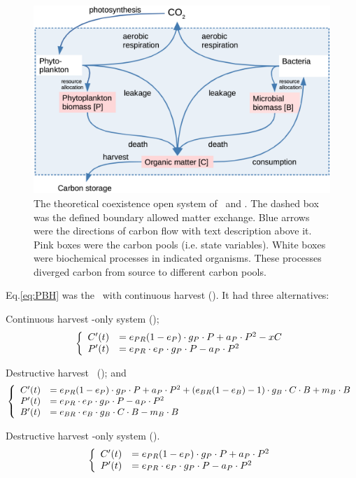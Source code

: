 \documentclass[../thesis.tex]{subfiles} %
\begin{document}
\begin{figure}[H]
    \centering
    \includegraphics[width=.8\linewidth]{media/model.png}
    \caption[Model visualization]{The theoretical coexistence open system of \phy\ and \bac.  The dashed box was the defined boundary allowed matter exchange.  Blue arrows were the directions of carbon flow with text description above it.  Pink boxes were the carbon pools (i.e. state variables).  White boxes were biochemical processes in indicated organisms.  These processes diverged carbon from source to different carbon pools.}
    \label{f:model}
\end{figure}

Eq.\ref{eq:PBH} was the \pbs\ with continuous harvest (\PBH).  It had three alternatives:

Continuous harvest \phy-only system (\PoH);
\begin{equation}\left\{\begin{array}{rl}
    C'(t) &= e_{PR}(1-e_P)\cdot g_P\cdot P +a_P\cdot P^2 -xC\\
    P'(t) &= e_{PR}\cdot e_P\cdot g_P\cdot P -a_P\cdot P^2
\end{array}\right.\label{eq:PoH}\end{equation}

Destructive harvest \pbs\ (\PBN); and
\begin{equation}\left\{\begin{array}{rl}
    C'(t) &= e_{PR}(1-e_P)\cdot g_P\cdot P +a_P\cdot P^2 +(e_{BR}(1-e_B)-1)\cdot g_B\cdot C\cdot B +m_B\cdot B\\
    P'(t) &= e_{PR}\cdot e_P\cdot g_P\cdot P -a_P\cdot P^2\\
    B'(t) &= e_{BR}\cdot e_B\cdot g_B\cdot C\cdot B -m_B\cdot B
\end{array}\right.\label{eq:PBN}\end{equation}

Destructive harvest \phy-only system (\PoN).
\begin{equation}\left\{\begin{array}{rl}
    C'(t) &= e_{PR}(1-e_P)\cdot g_P\cdot P +a_P\cdot P^2\\
    P'(t) &= e_{PR}\cdot e_P\cdot g_P\cdot P -a_P\cdot P^2
\end{array}\right.\label{eq:PoN}\end{equation}
\end{document}
